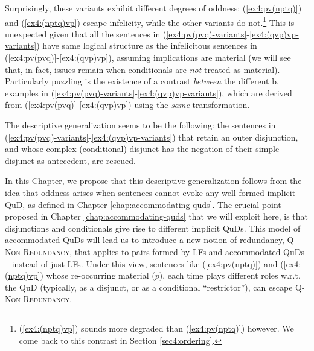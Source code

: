 Surprisingly, these variants exhibit different degrees of oddness: (\ref{ex4:pv(nptq)}) and (\ref{ex4:(nptq)vp}) escape infelicity, while the other variants do not.\footnote{(\ref{ex4:(nptq)vp}) sounds more degraded than (\ref{ex4:pv(nptq)}) however. We come back to this contrast in Section \ref{sec4:ordering}.} This is unexpected given that all the sentences in (\ref{ex4:pv(pvq)-variants}-\ref{ex4:(qvp)vp-variants}) have same logical structure as the infelicitous sentences in (\ref{ex4:pv(pvq)}-\ref{ex4:(qvp)vp}), assuming implications are material (we will see that, in fact, issues remain when conditionals are \textit{not} treated as material). Particularly puzzling is the existence of a contrast \textit{between} the different b. examples in (\ref{ex4:pv(pvq)-variants}-\ref{ex4:(qvp)vp-variants}), which are derived from (\ref{ex4:pv(pvq)}-\ref{ex4:(qvp)vp}) using the \textit{same} transformation.


The descriptive generalization seems to be the following: the sentences in (\ref{ex4:pv(pvq)-variants}-\ref{ex4:(qvp)vp-variants}) that retain an outer disjunction, and whose complex (conditional) disjunct has the negation of their simple disjunct as antecedent, are rescued.



In this Chapter, we propose that this descriptive generalization follows from the idea that oddness arises when sentences cannot evoke any well-formed implicit QuD, as defined in Chapter \ref{chap:accommodating-quds}. The crucial point proposed in Chapter \ref{chap:accommodating-quds}  that we will exploit here, is that disjunctions and conditionals give rise to different implicit QuDs. This model of accommodated QuDs will lead us to introduce a new notion of redundancy, \textsc{Q-Non-Redundancy}, that applies to pairs formed by LFs and accommodated QuDs -- instead of just LFs. Under this view, sentences like (\ref{ex4:pv(nptq)}) and (\ref{ex4:(nptq)vp}) whose re-occurring material ($p$), each time plays different roles w.r.t. the QuD (typically, as a disjunct, or as a conditional ``restrictor''), can escape \textsc{Q-Non-Redundancy}.\\


